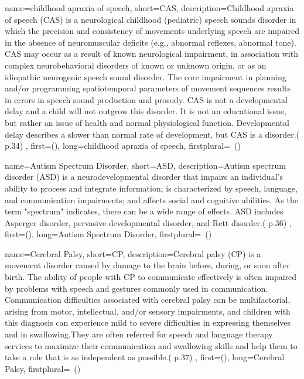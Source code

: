  {
	name={childhood apraxia of speech}, 
	short={CAS},
	description={Childhood apraxia of speech (CAS) is a neurological childhood (pediatric) speech sounds disorder in which the precision and consistency of movements underlying speech are impaired in the absence of neuromuscular deficits (e.g., abnormal reflexes, abnormal tone). CAS may occur as a result of known neurological impairment, in association with complex neurobehavioral disorders of known or unknown origin, or as an idiopathic neurogenic speech
sound disorder. The core impairment in planning and/or programming spatiotemporal parameters of movement sequences results in errors in speech sound production and prosody. CAS is not a developmental delay and a child will not outgrow this disorder. It is not an educational issue, but rather an issue of health and normal physiological function. Developmental delay describes a slower than normal rate of development, but CAS is a disorder.(\cite{SLPathologies} p.34)
},
first={}(),
	long={childhood apraxia of speech},
	firstplural={\glspluralsuffix\ (\glspluralsuffix )}
}

 {
	name={Autism Spectrum Disorder}, 
	short={ASD},
	description={Autism spectrum disorder (ASD) is a neurodevelopmental disorder that impairs an individual’s ability to process and integrate information; is characterized by speech, language, and communication impairments; and affects social and cognitive abilities. As the term "spectrum" indicates, there can be a wide range of effects. ASD includes Asperger disorder, pervasive developmental disorder, and Rett disorder.(\cite{SLPathologies} p.36)
},
first={}(),
	long={Autism Spectrum Disorder},
	firstplural={\glspluralsuffix\ (\glspluralsuffix )}
}

 {
	name={Cerebral Palsy}, 
	short={CP},
	description={Cerebral palsy (CP) is a movement disorder caused by damage to the brain before, during, or soon after birth. The ability of people with CP to communicate effectively is often impaired by problems with speech and gestures commonly used in communication. Communication difficulties associated with cerebral palsy can be multifactorial, arising from motor, intellectual, and/or sensory impairments, and children with this diagnosis can experience mild to severe difficulties in expressing themselves and in swallowing.They are often referred for speech and language therapy services to maximize their communication and swallowing skills and help them to take a role that is as independent as possible.(\cite{SLPathologies} p.37)
},
first={}(),
	long={Cerebral Palsy},
	firstplural={\glspluralsuffix\ (\glspluralsuffix )}
}

